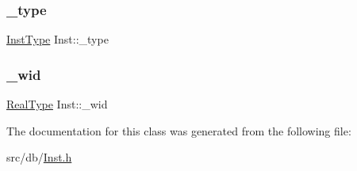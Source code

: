 \mbox{\label{classInst_a71f59c0ab13351f33a67c57839aa5e3d}} 
\subsubsection{\texorpdfstring{\+\_\+type}{\_type}}
{\footnotesize\ttfamily \hyperlink{type_8h_a53644c687d6bc203d9d3d3ee70075f61}{Inst\+Type} Inst\+::\+\_\+type\hspace{0.3cm}{\ttfamily [private]}}

\mbox{\label{classInst_ad9ded5bad369f4ab225372c839820ab9}} 
\subsubsection{\texorpdfstring{\+\_\+wid}{\_wid}}
{\footnotesize\ttfamily \hyperlink{type_8h_a51898ad9e46b1265f3fab67f7d4b04a2}{Real\+Type} Inst\+::\+\_\+wid\hspace{0.3cm}{\ttfamily [private]}}



The documentation for this class was generated from the following file\+:\begin{DoxyCompactItemize}
\item 
src/db/\hyperlink{Inst_8h}{Inst.\+h}\end{DoxyCompactItemize}
